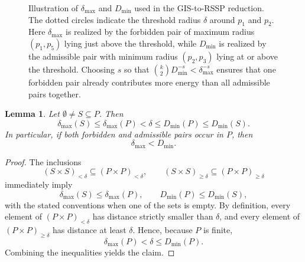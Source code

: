\documentclass[11pt]{article}
\newtheorem{lemma}{Lemma}
\begin{document}
\begin{figure}[t]
  \centering
  \begin{minipage}[t]{0.62\linewidth}
    \centering
    \caption{Illustration of $\delta_{\max}$ and $D_{\min}$ used in the GIS-to-RSSP reduction. The dotted circles indicate the threshold radius $\delta$ around $p_1$ and $p_2$. Here $\delta_{\max}$ is realized by the forbidden pair of maximum radius $(p_1,p_5)$ lying just above the threshold, while $D_{\min}$ is realized by the admissible pair with minimum radius $(p_2,p_3)$ lying at or above the threshold. Choosing $s$ so that $\binom{k}{2}D_{\min}^{-s}<\delta_{\max}^{-s}$ ensures that one forbidden pair already contributes more energy than all admissible pairs together.}
    \label{fig:dmin-dmax}
  \end{minipage}
\end{figure}

\begin{lemma}\label{lem:dmin-dmax-monotone}
Let $\emptyset\neq S\subseteq P$. Then
\[
\delta_{\max}(S)\le \delta_{\max}(P)<\delta\le D_{\min}(P)\le D_{\min}(S).
\]
In particular, if both forbidden and admissible pairs occur in $P$, then
\[
\delta_{\max}<D_{\min}.
\]
\end{lemma}

\begin{proof}
The inclusions
\[
(S\times S)_{<\delta}\subseteq (P\times P)_{<\delta},
\qquad
(S\times S)_{\ge\delta}\subseteq (P\times P)_{\ge\delta}
\]
immediately imply
\[
\delta_{\max}(S)\le \delta_{\max}(P),
\qquad
D_{\min}(P)\le D_{\min}(S),
\]
with the stated conventions when one of the sets is empty. By definition,
every element of $(P\times P)_{<\delta}$ has distance strictly smaller than
$\delta$, and every element of $(P\times P)_{\ge\delta}$ has distance at least
$\delta$. Hence, because $P$ is finite, 
\[
\delta_{\max}(P)<\delta\le D_{\min}(P).
\]
Combining the inequalities yields the claim.
\end{proof}
\end{document}
